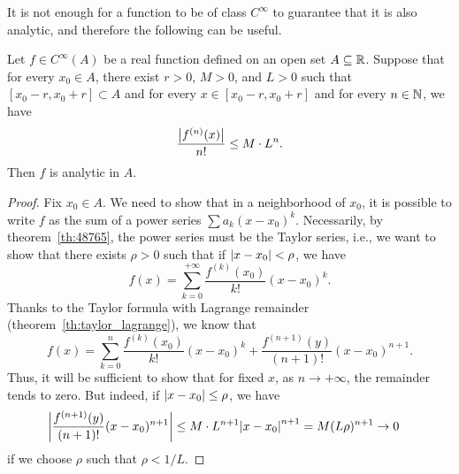 It is not enough for a function to be of class $C^\infty$ to guarantee that it
is also analytic, and therefore the following can be useful.

\begin{theorem}
\label{th:criterio_analitica}
Let $f\in C^\infty(A)$ be a real function defined on an open set $A\subseteq {\mathbb R}$.
Suppose that for every $x_0\in A$, there exist $r>0$, $M>0$, and $L>0$ such that
$[x_0-r, x_0+r] \subset A$ and for every $x\in [x_0-r, x_0+r]$ and for every
$n\in {\mathbb N}$, we have
\[
  \frac{{\left|f^{(n)}(x)\right|}}{n!} \le M\cdot L^n.
\]
Then $f$ is analytic in $A$.
\end{theorem}
%
\begin{proof}
Fix $x_0\in A$. We need to show that in a neighborhood of $x_0$, it is possible
to write $f$ as the sum of a power series $\sum a_k (x-x_0)^k$. Necessarily, by
theorem~\ref{th:48765}, the power series must be the Taylor series, i.e., we
want to show that there exists $\rho>0$ such that if ${\left|x-x_0\right|}< \rho$, we
have
\[
  f(x) = \sum_{k=0}^{+\infty} \frac{f^{(k)}(x_0)}{k!}(x-x_0)^k.
\]
Thanks to the Taylor formula with Lagrange remainder
(theorem~\ref{th:taylor_lagrange}), we know that
\[
  f(x) = \sum_{k=0}^{n} \frac{f^{(k)}(x_0)}{k!}(x-x_0)^k
   + \frac{f^{(n+1)}(y)}{(n+1)!}(x-x_0)^{n+1}.
\]
Thus, it will be sufficient to show that for fixed $x$, as $n\to +\infty$, the
remainder tends to zero. But indeed, if ${\left|x-x_0\right|}\le \rho$, we have
\begin{align*}
 {\left|\frac{f^{(n+1)}(y)}{(n+1)!}(x-x_0)^{n+1}\right|}
 & \le  M\cdot L^{n+1}{\left|x-x_0\right|}^{n+1}
 = M (L\rho)^{n+1}\to 0
\end{align*}
if we choose $\rho$ such that $\rho < 1/L$.
\end{proof}

